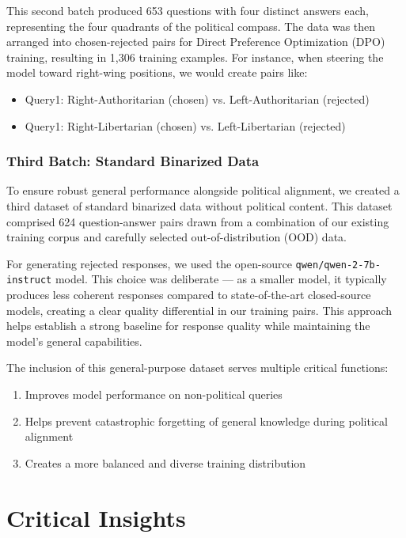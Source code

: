 \documentclass{article}
\begin{document}
This second batch produced 653 questions with four distinct answers each, representing the four quadrants of the political compass. The data was then arranged into chosen-rejected pairs for Direct Preference Optimization (DPO) training, resulting in 1,306 training examples. For instance, when steering the model toward right-wing positions, we would create pairs like:
\begin{itemize}
    \item Query1: Right-Authoritarian (chosen) vs. Left-Authoritarian (rejected)
    \item Query1: Right-Libertarian (chosen) vs. Left-Libertarian (rejected)
\end{itemize}

\subsubsection{Third Batch: Standard Binarized Data}

To ensure robust general performance alongside political alignment, we created a third dataset of standard binarized data without political content. This dataset comprised 624 question-answer pairs drawn from a combination of our existing training corpus and carefully selected out-of-distribution (OOD) data.

For generating rejected responses, we used the open-source \texttt{qwen/qwen-2-7b-instruct} model. This choice was deliberate --- as a smaller model, it typically produces less coherent responses compared to state-of-the-art closed-source models, creating a clear quality differential in our training pairs. This approach helps establish a strong baseline for response quality while maintaining the model's general capabilities.

The inclusion of this general-purpose dataset serves multiple critical functions:
\begin{enumerate}
    \item Improves model performance on non-political queries
    \item Helps prevent catastrophic forgetting of general knowledge during political alignment
    \item Creates a more balanced and diverse training distribution
\end{enumerate}

\section{Critical Insights}
\end{document}
